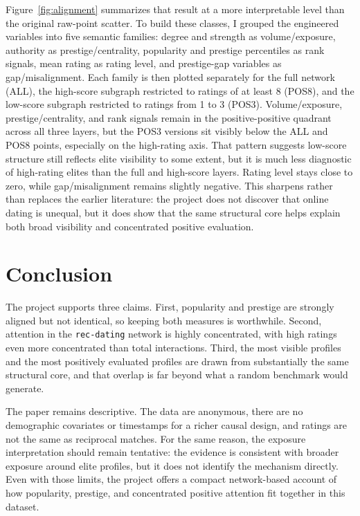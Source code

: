 \documentclass[10pt,twocolumn]{article}
\begin{document}
Figure~\ref{fig:alignment} summarizes that result at a more interpretable level than the original raw-point scatter. To build these classes, I grouped the engineered variables into five semantic families: degree and strength as volume/exposure, authority as prestige/centrality, popularity and prestige percentiles as rank signals, mean rating as rating level, and prestige-gap variables as gap/misalignment. Each family is then plotted separately for the full network (ALL), the high-score subgraph restricted to ratings of at least 8 (POS8), and the low-score subgraph restricted to ratings from 1 to 3 (POS3). Volume/exposure, prestige/centrality, and rank signals remain in the positive-positive quadrant across all three layers, but the POS3 versions sit visibly below the ALL and POS8 points, especially on the high-rating axis. That pattern suggests low-score structure still reflects elite visibility to some extent, but it is much less diagnostic of high-rating elites than the full and high-score layers. Rating level stays close to zero, while gap/misalignment remains slightly negative. This sharpens rather than replaces the earlier literature: the project does not discover that online dating is unequal, but it does show that the same structural core helps explain both broad visibility and concentrated positive evaluation.

\section{Conclusion}
The project supports three claims. First, popularity and prestige are strongly aligned but not identical, so keeping both measures is worthwhile. Second, attention in the \texttt{rec-dating} network is highly concentrated, with high ratings even more concentrated than total interactions. Third, the most visible profiles and the most positively evaluated profiles are drawn from substantially the same structural core, and that overlap is far beyond what a random benchmark would generate.

The paper remains descriptive. The data are anonymous, there are no demographic covariates or timestamps for a richer causal design, and ratings are not the same as reciprocal matches. For the same reason, the exposure interpretation should remain tentative: the evidence is consistent with broader exposure around elite profiles, but it does not identify the mechanism directly. Even with those limits, the project offers a compact network-based account of how popularity, prestige, and concentrated positive attention fit together in this dataset.



\end{document}
